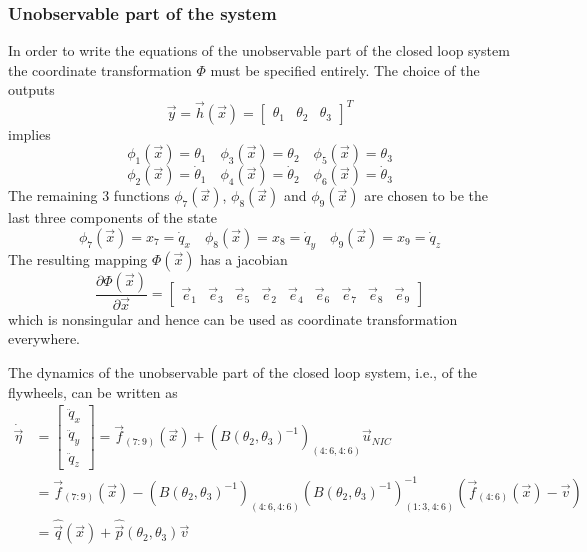 \subsubsection{Unobservable part of the system}
In order to write the equations of the unobservable part of the closed
loop system the coordinate transformation $\Phi$ must be specified entirely.
The choice of the outputs
\[
\vec{y} = \vec{h}(\vec{x}) =
\begin{bmatrix}
  \theta_1 &
  \theta_2 &
  \theta_3
\end{bmatrix}^T
\]
implies
\[
\phi_1 (\vec{x}) = \theta_1 \quad \phi_3 (\vec{x}) = \theta_2 \quad \phi_5 (\vec{x}) = \theta_3
\]
\[
\phi_2 (\vec{x}) = \dot{\theta}_1 \quad \phi_4 (\vec{x}) = \dot{\theta}_2 \quad \phi_6 (\vec{x}) = \dot{\theta}_3
\]
The remaining $3$ functions $\phi_7(\vec{x})$, $\phi_8(\vec{x})$ and $\phi_9(\vec{x})$ are chosen to be the last
three components of the state
\[
\phi_7(\vec{x}) = x_7 = \dot{q}_x \quad \phi_8(\vec{x}) = x_8 = \dot{q}_y
\quad \phi_9(\vec{x}) = x_9 = \dot{q}_z
\]
The resulting mapping $\Phi(\vec{x})$ has a jacobian
\[
\frac{\partial \Phi(\vec{x})}{\partial \vec{x}} =
\begin{bmatrix}
  \vec{e}_{1} & \vec{e}_{3} & \vec{e}_{5} & \vec{e}_{2} & \vec{e}_{4} & \vec{e}_{6} &
  \vec{e}_{7} & \vec{e}_{8} & \vec{e}_{9}
\end{bmatrix}
\]
which is nonsingular and hence can be used
as coordinate transformation everywhere.
\par
The dynamics of the unobservable part of the closed loop system, i.e.,
of the flywheels, can be written as
\[
\begin{split}
\dot{\vec{\eta}} &=
\begin{bmatrix}
  \ddot{q}_{x}\\
  \ddot{q}_{y}\\
  \ddot{q}_{z}
\end{bmatrix}
= \vec{f}_{(7:9)}(\vec{x}) + \left(B(\theta_2,\theta_3) ^ {-1}\right)_{(4:6, 4:6)} \vec{u}_{NIC}\\
&=\vec{f}_{(7:9)}(\vec{x}) - \left(B(\theta_2,\theta_3) ^ {-1}\right)_{(4:6, 4:6)}
\left(B(\theta_2,\theta_3) ^ {-1}\right)_{(1:3, 4:6)}^{-1}
(\vec{f}_{(4:6)}(\vec{x}) - \vec{v})\\
&=\hat{\vec{q}}(\vec{x}) + \hat{\vec{p}}(\theta_{2},\theta_{3})\vec{v}
\end{split}
\]

